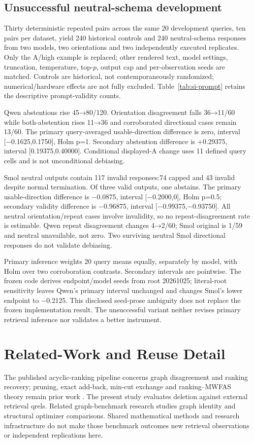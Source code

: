 \documentclass[pdflatex,sn-basic,Numbered]{sn-jnl}
\begin{document}
\subsection{Unsuccessful neutral-schema development}
Thirty deterministic repeated pairs across the same 20 development queries, ten pairs per dataset, yield 240 historical controls and 240 neutral-schema responses from two models, two orientations and two independently executed replicates. Only the A/high example is replaced; other rendered text, model settings, truncation, temperature, top-$p$, output cap and per-observation seeds are matched. Controls are historical, not contemporaneously randomized; numerical/hardware effects are not fully excluded.
Table~\ref{tab:si-prompt} retains the descriptive prompt-validity counts.

Qwen abstentions rise 45→80/120. Orientation disagreement falls 36→11/60 while both-abstention rises 11→36 and corroborated directional cases remain 13/60. The primary query-averaged usable-direction difference is zero, interval [−0.1625,0.1750], Holm p=1. Secondary abstention difference is +0.29375, interval [0.19375,0.40000]. Conditional displayed-A change uses 11 defined query cells and is not unconditional debiasing.

Smol neutral outputs contain 117 invalid responses:74 capped and 43 invalid despite normal termination. Of three valid outputs, one abstains. The primary usable-direction difference is −0.0875, interval [−0.2000,0], Holm p=0.5; secondary validity difference is −0.96875, interval [−0.99375,−0.93750]. All neutral orientation/repeat cases involve invalidity, so no repeat-disagreement rate is estimable. Qwen repeat disagreement changes 4→2/60; Smol original is 1/59 and neutral unavailable, not zero. Two surviving neutral Smol directional responses do not validate debiasing.

Primary inference weights 20 query means equally, separately by model, with Holm over two corroboration contrasts. Secondary intervals are pointwise. The frozen code derives endpoint/model seeds from root 20261025; literal-root sensitivity leaves Qwen's primary interval unchanged and changes Smol's lower endpoint to −0.2125. This disclosed seed-prose ambiguity does not replace the frozen implementation result. The unsuccessful variant neither revises primary retrieval inference nor validates a better instrument.

\section{Related-Work and Reuse Detail}\label{sec:si-related}
The published acyclic-ranking pipeline concerns graph disagreement and ranking recovery; pruning, exact add-back, min-cut exchange and ranking--MWFAS theory remain prior work \cite{vahidi2026acyclicranking}. The present study evaluates deletion against external retrieval qrels. Related graph-benchmark research studies graph identity and structural optimizer comparisons. Shared mathematical methods and research infrastructure do not make those benchmark outcomes new retrieval observations or independent replications here.
\end{document}
